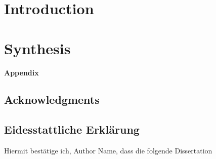 \documentclass[12pt, openany]{book}
\def\MYAUTHOR{Author Name}
\begin{document}
\newpage
\renewcommand{\chaptername}{}
\renewcommand{\headchapter}{Summary}


\setcounter{chapter}{-1}
\chapter[Introduction]{\centering Introduction\\}
\renewcommand{\headchapter}{Introduction}


\newpage
\renewcommand{\chaptername}{Chapter~}
\renewcommand{\headchapter}{\thechapter}


\chapter[Synthesis]{\centering Synthesis\\}
\renewcommand{\chaptername}{}
\renewcommand{\headchapter}{Synthesis}


\newpage
\renewcommand{\chaptername}{}
\mystyletwo
\renewcommand{\headchapter}{Lists}
{\Huge\normalfont\bfseries\textcolor{clrt1}{Appendix}}
\listoffigures
{}
\listofsupplFigures
{}
\listoftables
{}
\listofsupplTables

\newpage
\mystyleone
\renewcommand{\headchapter}{Author Contributions}


\newpage
\renewcommand{\headchapter}{CV}


\newpage
\renewcommand{\headchapter}{Acknowledgments}
\section*{Acknowledgments}


\newpage
\renewcommand{\headchapter}{~}
\section*{Eidesstattliche Erklärung}
Hiermit bestätige ich, \MYAUTHOR, dass die folgende Dissertation\vspace{1em}
\end{document}
